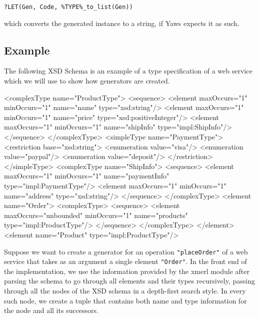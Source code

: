 \documentclass[copyright]{eptcs}
\begin{document}
\begin{center}
  \texttt{?LET(Gen, Code, \%TYPE\%\_to\_list(Gen))}
\end{center}
which converts the generated instance to a string, if Yaws expects it as such.

\subsection{Example}

The following XSD Schema is an example of a type specification of a web service 
which we will use to show how generators are created.

\begin{lstxsd}
  <complexType name="ProductType">
    <sequence>
      <element maxOccurs="1" minOccurs="1" name="name" type="xsd:string"/>
      <element maxOccurs="1" minOccurs="1" name="price" type="xsd:positiveInteger"/>
      <element maxOccurs="1" minOccurs="1" name="shipInfo" type="impl:ShipInfo"/>
    </sequence>
  </complexType>
  <simpleType name="PaymentType">
    <restriction base="xsd:string">
      <enumeration value="visa"/>
      <enumeration value="paypal"/>
      <enumeration value="deposit"/>
    </restriction>
  </simpleType>
  <complexType name="ShipInfo">
    <sequence>
      <element maxOccurs="1" minOccurs="1" name="paymentInfo" type="impl:PaymentType"/>
      <element maxOccurs="1" minOccurs="1" name="address" type="xsd:string"/>
    </sequence>
  </complexType>
  <element name="Order">
    <complexType>
      <sequence>
        <element maxOccurs="unbounded" minOccurs="1" name="products" type="impl:ProductType"/>
      </sequence>
    </complexType>
  </element>
  <element name="Product" type="impl:ProductType"/>
\end{lstxsd}


Suppose we want to create a generator for an operation
\texttt{"placeOrder"} of a web service that takes as an argument a
single element \texttt{"Order"}. In the front end of the
implementation, we use the information provided by the xmerl module
after parsing the schema to go through all elements and their types
recursively, passing through all the nodes of the XSD schema in a
depth-first search style. In every such node, we create a tuple that
contains both name and type information for the node and all its
successors.
\end{document}
